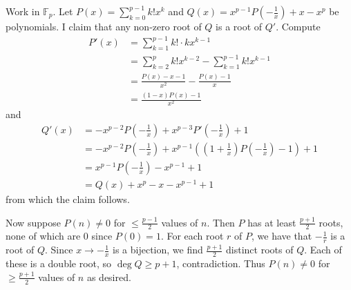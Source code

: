 Work in $\mathbb{F}_p$. Let $P(x)=\displaystyle\sum_{k=0}^{p-1}k!x^k$ and $Q(x)=x^{p-1}P\left(-\frac{1}{x}\right)+x-x^p$ be polynomials. I claim that any non-zero root of $Q$ is a root of $Q'$. Compute
\begin{align*}
	P'(x) &= \sum_{k=1}^{p-1} k!\cdot kx^{k-1} \\
	&= \sum_{k=2}^p k!x^{k-2} - \sum_{k=1}^{p-1} k!x^{k-1} \\
	&= \frac{P(x)-x-1}{x^2} - \frac{P(x)-1}{x} \\
	&= \frac{(1-x)P(x)-1}{x^2}
\end{align*}
and
\begin{align*}
	Q'(x) &= -x^{p-2}P\left(-\frac{1}{x}\right)+x^{p-3}P'\left(-\frac{1}{x}\right)+1 \\
	&= -x^{p-2}P\left(-\frac{1}{x}\right)+x^{p-1}\left(\left(1+\frac{1}{x}\right)P\left(-\frac{1}{x}\right)-1\right)+1 \\
	&= x^{p-1}P\left(-\frac{1}{x}\right)-x^{p-1}+1 \\
	&= Q(x)+x^p-x-x^{p-1}+1
\end{align*}
from which the claim follows.

Now suppose $P(n)\neq0$ for $\leq\frac{p-1}{2}$ values of $n$. Then $P$ has at least $\frac{p+1}{2}$ roots, none of which are $0$ since $P(0)=1$. For each root $r$ of $P$, we have that $-\frac{1}{r}$ is a root of $Q$. Since $x\to-\frac{1}{x}$ is a bijection, we find $\frac{p+1}{2}$ distinct roots of $Q$. Each of these is a double root, so $\deg Q\geq p+1$, contradiction. Thus $P(n)\neq0$ for $\geq\frac{p+1}{2}$ values of $n$ as desired.